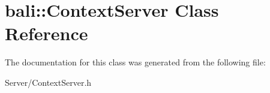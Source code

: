 \hypertarget{classbali_1_1_context_server}{\section{bali\-:\-:Context\-Server Class Reference}
\label{classbali_1_1_context_server}
}


The documentation for this class was generated from the following file\-:\begin{DoxyCompactItemize}
\item 
Server/Context\-Server.\-h\end{DoxyCompactItemize}
